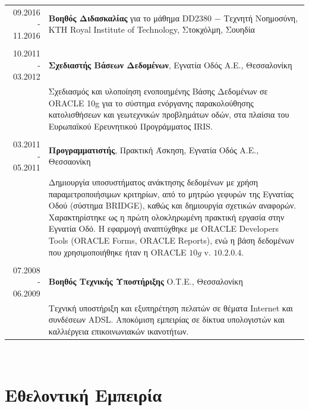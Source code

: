 \documentclass[a4paper,10pt,twoside]{article}
\begin{document}
\begin{tabular}{rp{12cm}}
09.2016 - 11.2016 & \textbf{Βοηθός Διδασκαλίας} για το μάθημα DD2380 $-$ Τεχνητή Νοημοσύνη, KTH Royal Institute of Technology, Στοκχόλμη, Σουηδία\\
&\\
10.2011 - 03.2012 & \textbf{Σχεδιαστής Βάσεων Δεδομένων}, Εγνατία Οδός Α.Ε., Θεσσαλονίκη \\
                  & Σχεδιασμός και υλοποίηση ενοποιημένης Βάσης Δεδομένων σε ORACLE 10g για
                    το σύστημα ενόργανης παρακολούθησης κατολισθήσεων και γεωτεχνικών προβλημάτων οδών,
                    στα πλαίσια του Ευρωπαϊκού Ερευνητικού Προγράμματος IRIS. \\
&\\
03.2011 - 05.2011 & \textbf{Προγραμματιστής}, Πρακτική Άσκηση, Εγνατία Οδός Α.Ε., Θεσσαονίκη \\
                  & Δημιουργία υποσυστήματος ανάκτησης δεδομένων με χρήση παραμετροποιήσιμων
                    κριτηρίων, από το μητρώο γεφυρών της Εγνατίας Οδού (σύστημα BRIDGE), καθώς και
                    δημιουργία σχετικών αναφορών. Χαρακτηρίστηκε ως η πρώτη ολοκληρωμένη πρακτική
                    εργασία στην Εγνατία Οδό. Η εφαρμογή αναπτύχθηκε με ORACLE Developers Tools
                    (ORACLE Forms, ORACLE Reports), ενώ η βάση δεδομένων που χρησιμοποιήθηκε ήταν η ORACLE $10g$ v. $10.2.0.4.$\\
&\\
07.2008 - 06.2009 & \textbf{Βοηθός Τεχνικής Υποστήριξης} Ο.Τ.Ε., Θεσσαλονίκη\\
                  & Τεχνική υποστήριξη και εξυπηρέτηση πελατών σε θέματα Internet
                    και συνδέσεων ADSL. Αποκόμιση εμπειρίας σε δίκτυα υπολογιστών
                    και καλλιέργεια επικοινωνιακών ικανοτήτων.\\
\end{tabular} \\



\section{Εθελοντική Εμπειρία}
\end{document}
